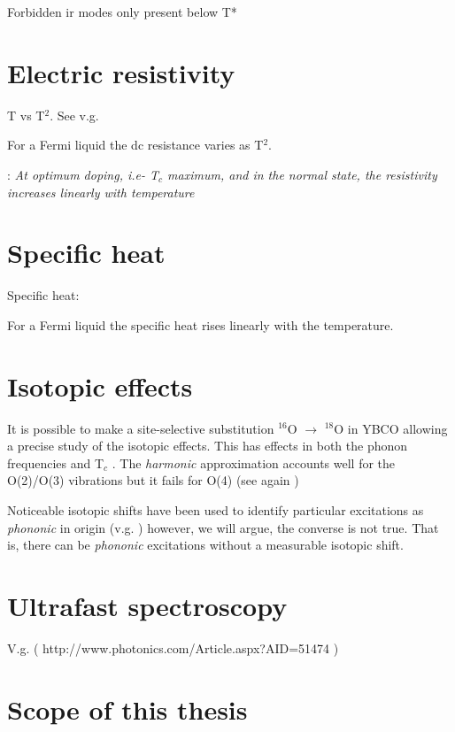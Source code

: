 Forbidden ir modes only present below T*

\section{Electric resistivity}
\label{sec:resistivity}

T vs T$^2$. See v.g. \cite{Timusk1999}

For a Fermi liquid the dc resistance varies as T$^2$.

\cite{Muller2007}: \textit{At optimum doping, i.e- T$_c$ maximum, and in the normal state, the resistivity increases linearly with temperature}

\section{Specific heat}
\label{sec:specific_heat}

Specific heat: \cite{Loram1993}

For a Fermi liquid the specific heat rises linearly with the temperature.

\section{Isotopic effects}
\label{sec:isotopic_effects}

It is possible to make a site-selective substitution $^{16}$O $\rightarrow$ $^{18}$O in YBCO \cite{Conder1993} allowing a precise study of the isotopic effects. 
This has effects in both the phonon frequencies \cite{Ruani1994} and T$_{c}$ \cite{Zech1994,Cardona1988}. 
The \textit{harmonic} approximation accounts well for the O(2)/O(3) vibrations but it fails for O(4) (see again \cite{Ruani1994})

Noticeable isotopic shifts have been used to identify particular excitations as \textit{phononic} in origin (v.g. \cite{Thomsen1990}) however, we will argue, the converse is not true. 
That is, there can be \textit{phononic} excitations without a measurable isotopic shift.

\section{Ultrafast spectroscopy}
\label{sec:ultrafast_spect}

V.g. \cite{Basov2005} \cite{Smallwood2012} ( http://www.photonics.com/Article.aspx?AID=51474 )

\section{Scope of this thesis}
\label{sec:scope}

